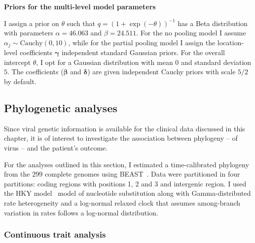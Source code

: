 \textbf{Priors for the multi-level model parameters}

I assign a prior on $\theta$ such that $q = (1 + \exp(-\theta))^{-1}$ has a Beta distribution with parameters $\alpha = 46.063$ and $\beta = 24.511$.
For the no pooling model I assume $\alpha_j\sim \text{Cauchy}(0, 10)$, while for the partial pooling model I assign the location-level coefficients $\boldsymbol \gamma$ independent standard Gaussian priors.
For the overall intercept $\theta$, I opt for a Gaussian distribution with mean $0$ and standard deviation $5$.
The coefficients ($\boldsymbol\beta$ and $\boldsymbol\delta$) are given independent Cauchy priors with scale $5/2$ by default.

\subsection{Phylogenetic analyses}

Since viral genetic information is available for the clinical data discussed in this chapter, it is of interest to investigate the association between phylogeny -- of virus -- and the patient's outcome.

For the analyses outlined in this section, I estimated a time-calibrated phylogeny from the $299$ complete genomes using BEAST~\citep{Drummond2012}.
Data were partitioned in four partitions: coding regions with positions 1, 2 and 3 and intergenic region.
I used the HKY model~\citep{Hasegawa1985} model of nucleotide substitution along with Gamma-distributed rate heterogeneity and a log-normal relaxed clock that assumes among-branch variation in rates follows a log-normal distribution.

\subsubsection{Continuous trait analysis}
\label{sec:cta}

